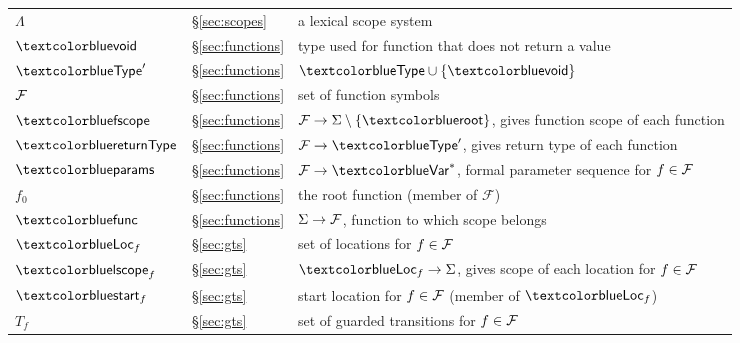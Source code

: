{\begin{tabular}{lll}
    $\Lambda$ & \S\ref{sec:scopes} & a lexical scope system\\
    $\void$ & \S\ref{sec:functions} & type used for function that does not return  a value\\
    $\Type'$ & \S\ref{sec:functions} & $\Type\cup\{\void\}$\\
    $\mathcal{F}$ & \S\ref{sec:functions} & set of function symbols\\
    $\fscope$ & \S\ref{sec:functions} & $\Func\ra\Sigma\setminus\{\rootscope\}$, gives function scope of each function\\
    $\returntype$ & \S\ref{sec:functions} & $\Func\ra\Type'$, gives return type of each function\\
    $\params$ & \S\ref{sec:functions} & $\Func\ra\Var^*$, formal
    parameter sequence for $f\in\mathcal{F}$\\
    $f_0$ & \S\ref{sec:functions} & the root function (member of
    $\mathcal{F}$)\\
    $\func$ & \S\ref{sec:functions} & $\Sigma\rightarrow\mathcal{F}$, function to
    which scope belongs\\
    $\Loc_f$ & \S\ref{sec:gts} & set of locations for $f\in\mathcal{F}$\\
    $\lscope_f$ & \S\ref{sec:gts} & $\Loc_f\ra\Sigma$, gives scope of each location for $f\in\mathcal{F}$\\
    $\start_f$ & \S\ref{sec:gts} & start location for $f\in\mathcal{F}$ (member of $\Loc_f$)\\
    $T_f$ & \S\ref{sec:gts} & set of guarded transitions for $f\in\mathcal{F}$\\
  \end{tabular}
}



\newcommand{\cckey}{\$}
\newcommand{\cc}[1]{\mbox{\texttt{\cckey{}#1}}}
\newcommand{\cabstract}{\cc{abstract}}
\newcommand{\ccontains}{\cc{contains}}
\newcommand{\ccopy}{\cc{copy}}
\newcommand{\cproc}{\cc{proc}}
\newcommand{\cprocdefined}{\cc{proc{\U}defined}}
\newcommand{\cprocNull}{\cc{proc{\U}null}}
\newcommand{\cself}{\cc{self}}
\newcommand{\cinput}{\cc{input}}
\newcommand{\coutput}{\cc{output}}
\newcommand{\cspawn}{\cc{spawn}}
\newcommand{\cwait}{\cc{wait}}
\newcommand{\cwaitall}{\cc{waitall}}
\newcommand{\cassert}{\cc{assert}}
\newcommand{\ctrue}{\cc{true}}
\newcommand{\cfalse}{\cc{false}}
\newcommand{\cassume}{\cc{assume}}
\newcommand{\catom}{\cc{atom}}
\newcommand{\catomic}{\cc{atomic}}
\newcommand{\cwhen}{\cc{when}}
\newcommand{\cchoose}{\cc{choose}}
\newcommand{\cchooseint}{\cc{choose{\U}int}}
\newcommand{\cinvariant}{\cc{invariant}}
\newcommand{\crequires}{\cc{requires}}
\newcommand{\censures}{\cc{ensures}}
\newcommand{\cexit}{\cc{exit}}
\newcommand{\cresult}{\cc{result}}
\newcommand{\cat}{\texttt{@}}
\newcommand{\ccollective}{\cc{collective}}
\newcommand{\cequals}{\cc{equals}}
\newcommand{\cfor}{\cc{for}}
\newcommand{\cparfor}{\cc{parfor}}

